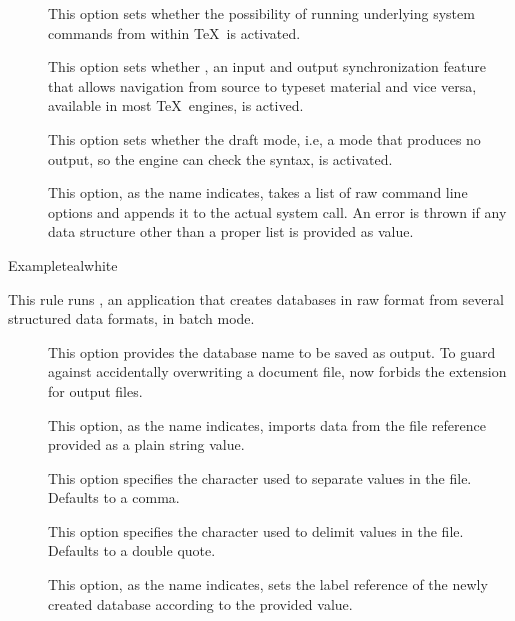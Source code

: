 \begin{description}
\begin{description}
\item[] This option sets whether the possibility of running underlying system commands from within \TeX\ is activated.

\item[] This option sets whether , an input and output synchronization feature that allows navigation from source to typeset material and vice versa, available in most \TeX\ engines, is actived.

\item[] This option sets whether the draft mode, i.e, a mode that produces no output, so the engine can check the syntax, is activated.

\item[] This option, as the name indicates, takes a list of raw command line options and appends it to the actual system call. An error is thrown if any data structure other than a proper list is provided as value.
\end{description}

\begin{codebox}{Example}{teal}{\icnote}{white}
\end{codebox}

\item[\rulebox{datatooltk}{Nicola Talbot, Paulo Cereda}] This rule runs , an application that creates  databases in raw for­mat from several structured data formats, in batch mode.

\begin{description}
\item[] This option provides the database name to be saved as output. To guard against accidentally overwriting a document file,  now forbids the  extension for output files.

\item[] This option, as the name indicates, imports data from the  file reference provided as a plain string value.

\item[] This option specifies the character used to separate values in the  file. Defaults to a comma.

\item[] This option specifies the character used to delimit values in the  file. Defaults to a double quote.

\item[] This option, as the name indicates, sets the label reference of the newly created database according to the provided value.


\end{description}
\end{description}
